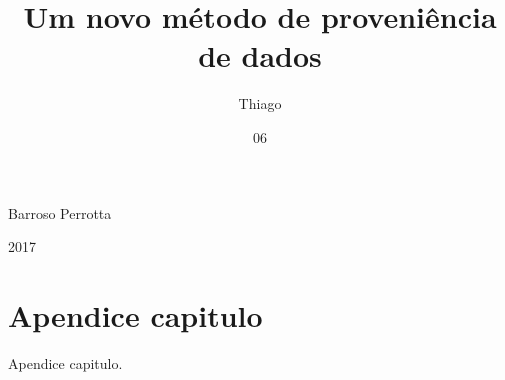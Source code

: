 \documentclass[grad,numbers]{coppetex/coppe}
\begin{document}
  \title{Um novo método de proveniência de dados}
  \foreigntitle{}

  \author{Thiago}{Barroso Perrotta}


  \date{06}{2017}



  \listoftodos{}

  \maketitle
  \frontmatter{}

  \dedication{dedication aqui}
  
  

  \tableofcontents
  \listoffigures
  \listoftables
  \printlosymbols{}
  \printloabbreviations{}

  \mainmatter{}
  

  \backmatter{}
  
  

  \appendix

  \chapter{Apendice capitulo}

  Apendice capitulo.
\end{document}
